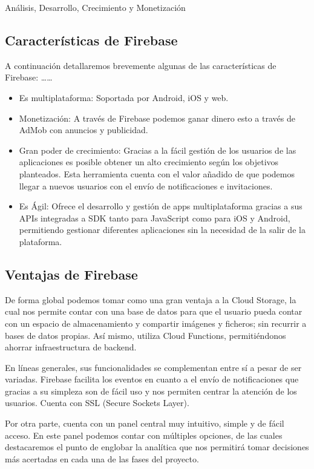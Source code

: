 \documentclass{article}
\begin{document}
Análisis, Desarrollo, Crecimiento y Monetización

\subsection{Características de Firebase}
A continuación detallaremos brevemente algunas de las características de Firebase:
\dots  \dots
\begin{itemize}
\item Es multiplataforma: Soportada por Android, iOS y web.
\item Monetización: A través de Firebase podemos ganar dinero esto a través de AdMob con anuncios y publicidad.
\item Gran poder de crecimiento: Gracias a la fácil gestión de los usuarios de las aplicaciones es posible obtener un alto crecimiento según los objetivos planteados. Esta herramienta cuenta con el valor añadido de que podemos llegar a nuevos usuarios con el envío de notificaciones e invitaciones.
\item  Es Ágil: Ofrece el desarrollo y gestión de apps multiplataforma gracias a sus APIs integradas a SDK tanto para JavaScript como para iOS y Android, permitiendo gestionar diferentes aplicaciones sin la necesidad de la salir de la plataforma.
\end{itemize}

\subsection{Ventajas de Firebase}
De forma global podemos tomar como una gran ventaja a la Cloud Storage, la cual nos permite contar con una base de datos para que el usuario pueda contar con un espacio de almacenamiento y compartir imágenes y ficheros; sin recurrir a bases de datos propias. Así mismo, utiliza Cloud Functions, permitiéndonos ahorrar infraestructura de backend.

En líneas generales, sus funcionalidades se complementan entre sí a pesar de ser variadas. Firebase facilita los eventos en cuanto a el envío de notificaciones que gracias a su simpleza son de fácil uso y nos permiten centrar la atención de los usuarios. Cuenta con SSL (Secure Sockets Layer).

Por otra parte, cuenta con un panel central muy intuitivo, simple y de fácil acceso. En este panel podemos contar con múltiples opciones, de las cuales destacaremos el punto de englobar la analítica que nos permitirá tomar decisiones más acertadas en cada una de las fases del proyecto.
\end{document}

